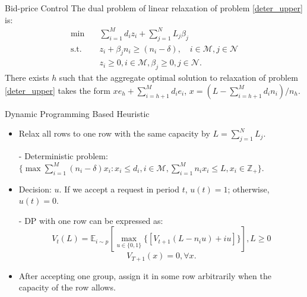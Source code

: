       \begin{frame}{Bid-price Control}
        The dual problem of linear relaxation of problem \eqref{deter_upper} is:
        \begin{equation}\label{bid-price_dual}
          \begin{aligned}
          \min \quad & \sum_{i=1}^{M} d_i z_i + \sum_{j= 1}^{N} L_j \beta_{j} \\
          \text {s.t.} \quad & z_{i} + \beta_j n_i \geq (n_i-\delta), \quad i \in \mathcal{M}, j \in \mathcal{N} \\
          & z_{i} \geq 0, i \in \mathcal{M}, \beta_{j} \geq 0, j \in \mathcal{N}.
          \end{aligned}
        \end{equation}
        \small There exists $h$ such that the aggregate optimal solution to relaxation of problem \eqref{deter_upper} takes the form $x e_{h} + \sum_{i=h+1} ^{M} d_{i} e_{i}$, $x = (L- \sum_{i = h+1}^{M} {d_i n_i})/ n_h$.

      \end{frame}

      \begin{frame}{Dynamic Programming Based Heuristic}
        \begin{itemize}
        \item Relax all rows to one row with the same capacity by $L = \sum_{j=1}^{N} L_j$.
        \item[-] Deterministic problem: $\{\max \sum_{i=1}^{M} (n_i- \delta) x_{i}: x_{i} \leq d_{i}, i \in \mathcal{M}, \sum_{i=1}^{M} n_{i} x_{i} \leq L, x_{i} \in \mathbb{Z}_{+}\}$.
        \item Decision: $u$. If we accept a request in period $t$, $u(t) = 1$; otherwise, $u(t) =0$.  
        \item[-] DP with one row can be expressed as:
        $$V_{t}(L) = \mathbb{E}_{i \sim p} [\max_{u \in \{0,1\}} \{ {[V_{t+1}(L-n_i u)+ i u]}\}], L \geq 0$$ 
        $$V_{T+1}(x) =0, \forall x.$$
        \item After accepting one group, assign it in some row arbitrarily when the capacity of the row allows.
        \end{itemize}
      \end{frame}
      
